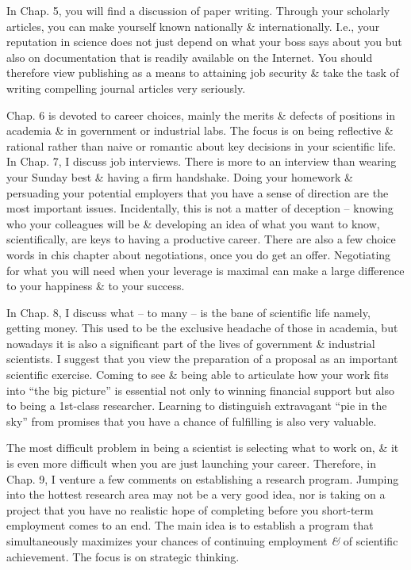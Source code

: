\documentclass{article}
\begin{document}
\begin{enumerate}
\begin{itemize}
		In Chap. 5, you will find a discussion of paper writing. Through your scholarly articles, you can make yourself known nationally \& internationally. I.e., your reputation in science does not just depend on what your boss says about you but also on documentation that is readily available on the Internet. You should therefore view publishing as a means to attaining job security \& take the task of writing compelling journal articles very seriously.

		Chap. 6 is devoted to career choices, mainly the merits \& defects of positions in academia \& in government or industrial labs. The focus is on being reflective \& rational rather than naive or romantic about key decisions in your scientific life. In Chap. 7, I discuss job interviews. There is more to an interview than wearing your Sunday best \& having a firm handshake. Doing your homework \& persuading your potential employers that you have a sense of direction are the most important issues. Incidentally, this is not a matter of deception -- knowing who your colleagues will be \& developing an idea of what you want to know, scientifically, are keys to having a productive career. There are also a few choice words in chis chapter about negotiations, once you do get an offer. Negotiating for what you will need when your leverage is maximal can make a large difference to your happiness \& to your success.

		In Chap. 8, I discuss what -- to many -- is the bane of scientific life namely, getting money. This used to be the exclusive headache of those in academia, but nowadays it is also a significant part of the lives of government \& industrial scientists. I suggest that you view the preparation of a proposal as an important scientific exercise. Coming to see \& being able to articulate how your work fits into ``the big picture'' is essential not only to winning financial support but also to being a 1st-class researcher. Learning to distinguish extravagant ``pie in the sky'' from promises that you have a chance of fulfilling is also very valuable.

		The most difficult problem in being a scientist is selecting what to work on, \& it is even more difficult when you are just launching your career. Therefore, in Chap. 9, I venture a few comments on establishing a research program. Jumping into the hottest research area may not be a very good idea, nor is taking on a project that you have no realistic hope of completing before you short-term employment comes to an end. The main idea is to establish a program that simultaneously maximizes your chances of continuing employment {\it\&} of scientific achievement. The focus is on strategic thinking.


\end{itemize}
\end{enumerate}
\end{document}
